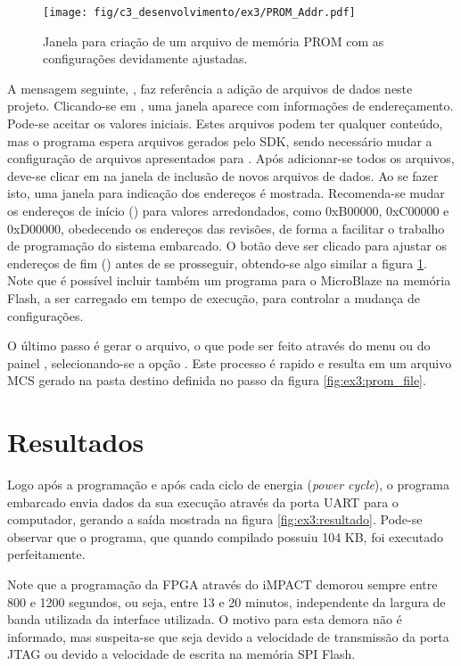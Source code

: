 \documentclass[11pt,a4paper,oneside]{book}
\begin{document}
\begin{figure}[htp]
\centering
\texttt{[image: fig/c3\_desenvolvimento/ex3/PROM\_Addr.pdf]}
\caption{Janela para criação de um arquivo de memória PROM com as configurações devidamente ajustadas.}
\label{fig:ex3:prom_addr}
\end{figure}

A mensagem seguinte, , faz referência a adição de arquivos de dados neste projeto.
Clicando-se em , uma janela aparece com informações de endereçamento.
Pode-se aceitar os valores iniciais.
Estes arquivos podem ter qualquer conteúdo, mas o programa espera arquivos gerados pelo SDK, sendo necessário mudar a configuração de arquivos apresentados para .
Após adicionar-se todos os arquivos, deve-se clicar em  na janela de inclusão de novos arquivos de dados.
Ao se fazer isto, uma janela para indicação dos endereços é mostrada.
Recomenda-se mudar os endereços de início () para valores arredondados, como 0xB00000, 0xC00000 e 0xD00000, obedecendo os endereços das revisões, de forma a facilitar o trabalho de programação do sistema embarcado.
O botão  deve ser clicado para ajustar os endereços de fim () antes de se prosseguir, obtendo-se algo similar a figura \ref{fig:ex3:prom_addr}.
Note que é possível incluir também um programa para o MicroBlaze na memória Flash, a ser carregado em tempo de execução, para controlar a mudança de configurações.

O último passo é gerar o arquivo, o que pode ser feito através do menu  ou do painel , selecionando-se a opção .
Este processo é rapido e resulta em um arquivo MCS gerado na pasta destino definida no passo da figura \ref{fig:ex3:prom_file}.

\section{Resultados}
Logo após a programação e após cada ciclo de energia (\textit{power cycle}), o programa embarcado envia dados da sua execução através da porta UART para o computador, gerando a saída mostrada na figura \ref{fig:ex3:resultado}.
Pode-se observar que o programa, que quando compilado possuiu 104 KB, foi executado perfeitamente.

Note que a programação da FPGA através do iMPACT demorou sempre entre 800 e 1200 segundos, ou seja, entre 13 e 20 minutos, independente da largura de banda utilizada da interface utilizada.
O motivo para esta demora não é informado, mas suspeita-se que seja devido a velocidade de transmissão da porta JTAG ou devido a velocidade de escrita na memória SPI Flash.
\end{document}
